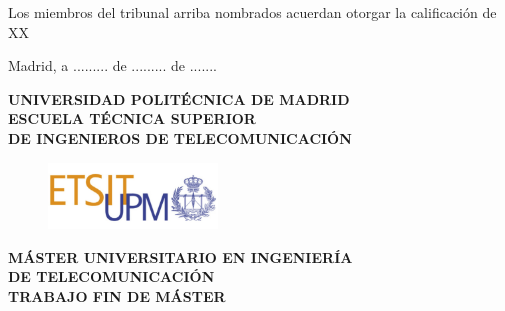 \begin{flushright}
 {\large Los miembros del tribunal arriba nombrados acuerdan otorgar la calificación de XX}
\end{flushright}
\vspace{1cm}
\begin{flushright}
{\large Madrid, a ......... de ......... de .......}
\end{flushright}
\pagestyle{empty}
\cleardoublepage
\vspace*{\baselineskip}
\begin{center}
	
	{\LARGE\textbf{UNIVERSIDAD POLITÉCNICA DE MADRID}\\}
	    \vspace{1.0cm}
	 {\large\textbf{ESCUELA TÉCNICA SUPERIOR \\ DE INGENIEROS DE TELECOMUNICACIÓN
	}   \\}

    \begin{figure}[!htbp]
	    \centering
        \includegraphics[width=0.4\textwidth]{img/logo_etsit.jpg}
    \end{figure}
    
	\vspace{1.0cm}
	{\LARGE\textbf{ MÁSTER UNIVERSITARIO EN INGENIERÍA \\ DE TELECOMUNICACIÓN \\ 
	    \vspace{0.5cm}
	TRABAJO FIN DE MÁSTER\\
	    \vspace{2.0cm}
        \tfgtitle }\\ 
	}
	\vspace{1.0cm}
    \Large\textbf{\authorname}\\ 
    \vspace{0.5cm}
    \fecha
\end{center}  

\cleardoublepage
